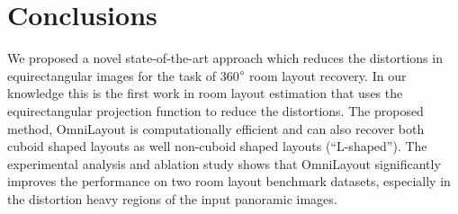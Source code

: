 \documentclass[final]{cvpr}
\begin{document}
\section{Conclusions}\label{sec:con}

We proposed a novel state-of-the-art approach which reduces the distortions in equirectangular images for the task of 360$\degree$ room layout recovery. In our knowledge this is the first work in room layout estimation that uses the equirectangular projection function to reduce the distortions. The proposed method, OmniLayout is computationally efficient and can also recover both cuboid shaped layouts as well non-cuboid shaped layouts (``L-shaped''). The experimental analysis and ablation study shows that OmniLayout significantly improves the performance on two room layout benchmark datasets, especially in the distortion heavy regions of the input panoramic images. 
{\small


}
\end{document}
